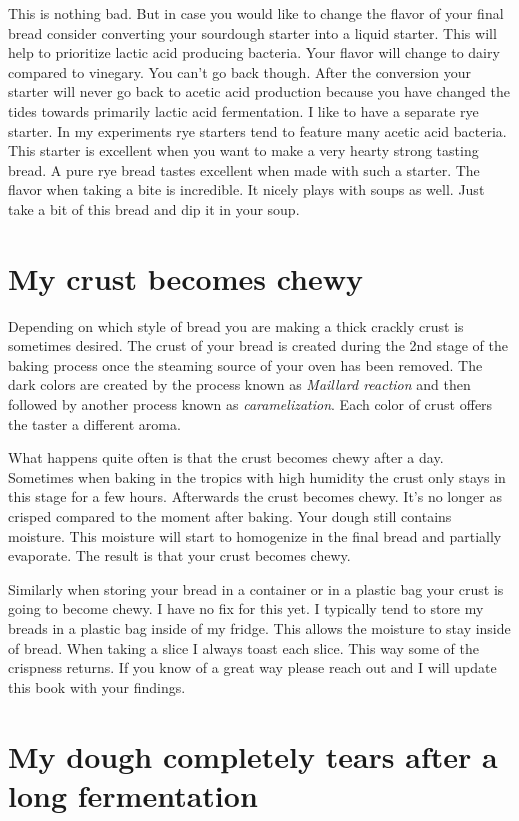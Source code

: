 This is nothing bad. But in case you would like to change
the flavor of your final bread consider converting
your sourdough starter into a liquid starter. This will
help to prioritize lactic acid producing bacteria.
Your flavor will change to dairy compared to vinegary.
You can't go back though. After the conversion your starter
will never go back to acetic acid production because you have
changed the tides towards primarily lactic acid fermentation.
I like to have a separate rye starter. In my experiments
rye starters tend to feature many acetic acid bacteria.
This starter is excellent when you want to make a very hearty
strong tasting bread. A pure rye bread tastes excellent when
made with such a starter. The flavor when taking a bite
is incredible. It nicely plays with soups as well. Just take
a bit of this bread and dip it in your soup.

\section{My crust becomes chewy}

Depending on which style of bread you are making a
thick crackly crust is sometimes desired. The crust
of your bread is created during the 2nd stage of the
baking process once the steaming source of your
oven has been removed. The dark colors are created by
the process known as {\it Maillard reaction} and then followed
by another process known as {\it caramelization}. Each
color of crust offers the taster a different aroma.

What happens quite often is that the crust becomes chewy after a day.
Sometimes when baking in the tropics with high humidity the
crust only stays in this stage for a few hours. Afterwards
the crust becomes chewy. It's no longer as crisped compared
to the moment after baking. Your dough still contains moisture.
This moisture will start to homogenize in the final bread and
partially evaporate. The result is that your crust becomes chewy.

Similarly when storing your bread in a container or in a plastic
bag your crust is going to become chewy. I have no fix for this yet.
I typically tend to store my breads in a plastic bag inside of my fridge.
This allows the moisture to stay inside of bread. When taking a slice
I always toast each slice. This way some of the crispness returns.
If you know of a great way please reach out and I will update
this book with your findings.

\section{My dough completely tears after a long fermentation}

